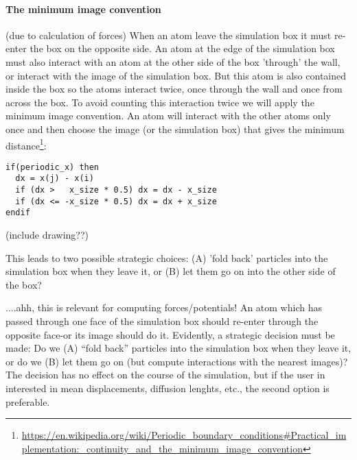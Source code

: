 \documentclass[11pt,a4wide]{article}
\begin{document}
\paragraph{The minimum image convention} (due to calculation of forces)
When an atom leave the simulation box it must re-enter the box on the opposite side. An atom at the edge of the simulation box must also interact with an atom at the other side of the box 'through' the wall, or interact with the image of the simulation box. But this atom is also contained inside the box so the atoms interact twice, once through the wall and once from across the box. To avoid counting this interaction twice we will apply the minimum image convention. An atom will interact with the other atoms only once and then choose the image (or the simulation box) that gives the minimum distance\footnote{\url{https://en.wikipedia.org/wiki/Periodic\_boundary\_conditions\#Practical\_implementation:\_continuity\_and\_the\_minimum\_image\_convention}}:

\begin{lstlisting}
if(periodic_x) then
  dx = x(j) - x(i)
  if (dx >   x_size * 0.5) dx = dx - x_size
  if (dx <= -x_size * 0.5) dx = dx + x_size
endif
\end{lstlisting}

(include drawing??)

This leads to two possible strategic choices: (A) 'fold back' particles into the simulation box when they leave it, or (B) let them go on into the other side of the box?

....ahh, this is relevant for computing forces/potentials!
An atom which has passed through one face of the simulation box should re-enter through the opposite face-or its image should do it. Evidently, a strategic decision must be made: Do we (A) “fold back” particles into the simulation box when they leave it, or do we (B) let them go on (but compute interactions with the nearest images)? The decision has no effect on the course of the simulation, but if the user in interested in mean displacements, diffusion lenghts, etc., the second option is preferable.
\end{document}
